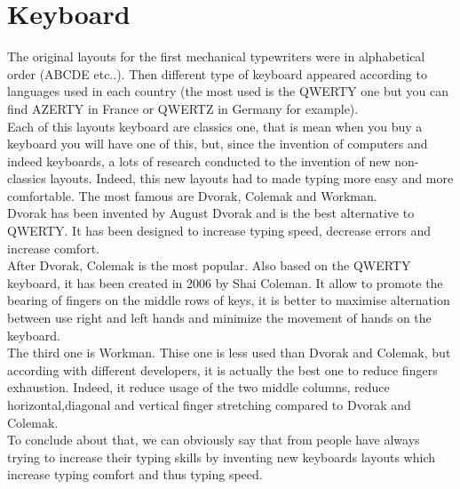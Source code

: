 \section{Keyboard}
The original layouts for the first mechanical typewriters were in alphabetical order (ABCDE etc..). Then different type of keyboard appeared according to languages used in each country (the most used is the QWERTY one but you can find AZERTY in France or QWERTZ in Germany for example).\\
Each of this layouts keyboard are classics one, that is mean when you buy a keyboard you will have one of this, but, since the invention of computers and indeed keyboards, a lots of research 	conducted to the invention of new non-classics layouts. Indeed, this new layouts had to made typing more easy and more comfortable. The most famous are Dvorak, Colemak and Workman.\\
Dvorak has been invented by August Dvorak and is the best alternative to QWERTY. It has been designed to increase typing speed, decrease errors and increase comfort.\\
After Dvorak, Colemak is the most popular. Also based on the QWERTY keyboard, it has been created in 2006 by Shai Coleman. It allow to promote the bearing of fingers on the middle rows of keys, it is better to maximise alternation between use right and left hands and minimize the movement of hands on the keyboard.\\
The third one is Workman. Thise one is less used than Dvorak and Colemak, but according with different developers, it is actually the best one to reduce fingers exhaustion. Indeed, it reduce usage of the two middle columns, reduce horizontal,diagonal and vertical finger stretching compared to Dvorak and Colemak.\cite{ref6}\\
To conclude about that, we can obviously say that from people have always trying to increase their typing skills by inventing new keyboards layouts which increase typing comfort and thus typing speed.     
